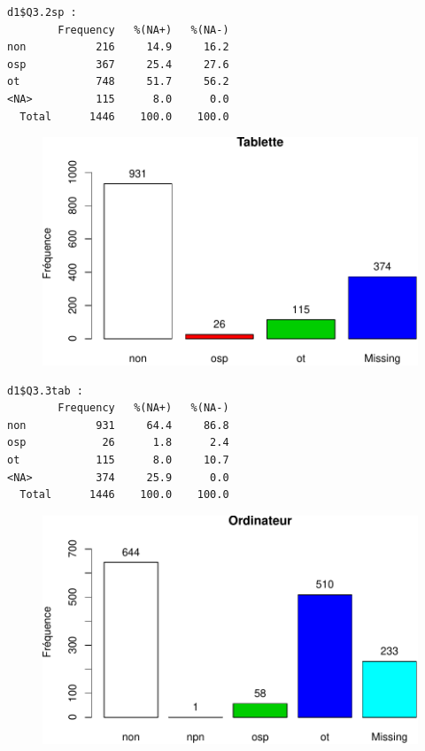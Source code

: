 \documentclass[]{article}
\begin{document}
\begin{verbatim}
d1$Q3.2sp : 
        Frequency   %(NA+)   %(NA-)
non           216     14.9     16.2
osp           367     25.4     27.6
ot            748     51.7     56.2
<NA>          115      8.0      0.0
  Total      1446    100.0    100.0
\end{verbatim}

\begin{figure}[htbp]
\centering
\includegraphics{qs_etudiants_files/figure-latex/outils-3.pdf}
\end{figure}

\begin{verbatim}
d1$Q3.3tab : 
        Frequency   %(NA+)   %(NA-)
non           931     64.4     86.8
osp            26      1.8      2.4
ot            115      8.0     10.7
<NA>          374     25.9      0.0
  Total      1446    100.0    100.0
\end{verbatim}

\begin{figure}[htbp]
\centering
\includegraphics{qs_etudiants_files/figure-latex/outils-4.pdf}
\end{figure}
\end{document}

